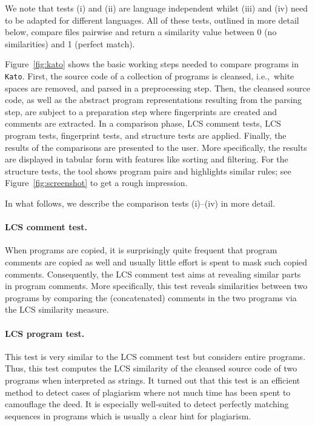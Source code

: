 \documentclass{tlp}
\newcommand{\iec}[0]{i.e.,\ }
\newcommand{\kato}[0]{\texttt{Kato}\xspace}
\begin{document}
We note that tests (i) and (ii) are language independent whilst (iii) and (iv) need to be adapted for
different languages.
All of these tests, outlined in more detail below, compare files pairwise and return a similarity value between 0 (no similarities) and 1 (perfect match). 

Figure~\ref{fig:kato} shows the basic working steps needed to compare programs in \kato.
First, the source code  of a collection of  programs is
cleansed, \iec white spaces are removed, and parsed  in a  preprocessing step. 
Then, the cleansed source code, as well as the abstract program representations resulting from the parsing step, are
 subject to a preparation step where fingerprints are created and comments are extracted. 
In a comparison phase, LCS comment tests, LCS program tests, fingerprint tests, and structure tests are applied. 
Finally,
the results of the comparisons are presented to the user. 
More specifically, the results are displayed in 
tabular form with features like sorting and filtering.
For the structure tests, the tool shows program pairs and 
highlights similar rules; see Figure~\ref{fig:screenshot} to get a rough impression. 

In what follows, we describe the comparison tests (i)--(iv) in more detail.

\paragraph{LCS comment test.}
When programs are copied, it is surprisingly quite frequent that program comments are copied as well and usually little effort is spent to mask such copied comments.
Consequently, the LCS comment test aims at revealing similar parts in program comments.
More specifically, this test reveals similarities between two programs by comparing the (concatenated) comments
in the two programs via the LCS similarity measure.

\paragraph{LCS program test.}
This test is very similar to the LCS comment test but considers entire programs.
Thus, this test computes the LCS similarity of the  cleansed source code of two programs when interpreted as strings.
It turned out that this test is an efficient method to detect
cases of plagiarism where not much time has been spent to camouflage the deed.  
It is  especially well-suited to detect perfectly matching sequences in programs which is usually a
clear hint for plagiarism.
\end{document}
